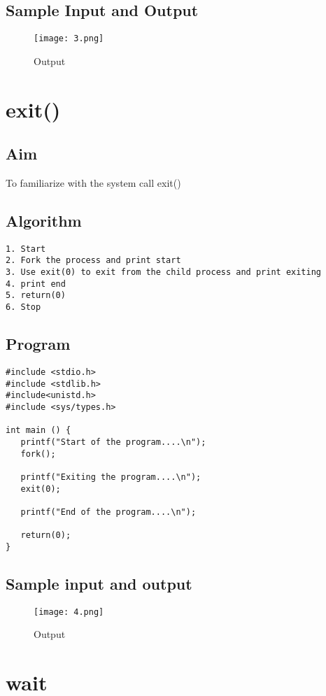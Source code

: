 \documentclass{article}
\begin{document}
\subsection{Sample Input and Output}
\begin{figure}[H]
    \centering
    \texttt{[image: 3.png]}
    \caption{Output}
    \label{fig:my_label2}
\end{figure}
\section{\Large exit() }
\subsection{Aim}
To familiarize with the system call exit()
\subsection{Algorithm}
\begin{Verbatim}[tabsize = 4]
1. Start
2. Fork the process and print start
3. Use exit(0) to exit from the child process and print exiting
4. print end
5. return(0)
6. Stop
\end{Verbatim}
\thispagestyle{third}
\subsection{Program}
\begin{Verbatim}[tabsize = 4]
#include <stdio.h>
#include <stdlib.h>
#include<unistd.h>
#include <sys/types.h>

int main () {
   printf("Start of the program....\n");
   fork();
   
   printf("Exiting the program....\n");
   exit(0);

   printf("End of the program....\n");

   return(0);
}

\end{Verbatim}
\subsection{Sample input and output}
\begin{figure}[H]
    \centering
    \texttt{[image: 4.png]}
    \caption{Output}
    \label{fig:my_label2}
\end{figure}
\section{\Large wait}
\end{document}
